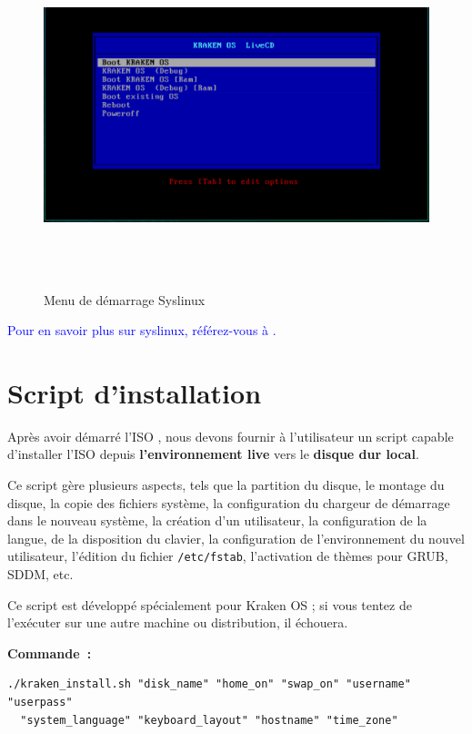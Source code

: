 \begin{figure}[H]
  \centering
  \includegraphics[width=1\textwidth, height=10cm]{images_pfe/syslinuxmenu.png}
  \caption{Menu de démarrage Syslinux}
  \label{fig:syslinux}
\end{figure}
\textcolor{blue}{Pour en savoir plus sur syslinux, référez-vous à \cite{syslinux}.}\\
\section{Script d'installation }
\label{secc:sctipttui}

Après avoir démarré l'ISO , nous devons fournir à l'utilisateur un script capable d'installer l'ISO depuis \textbf{l'environnement live} vers le \textbf{disque dur local}.

Ce script gère plusieurs aspects, tels que la partition du disque, le montage du disque, la copie des fichiers système, la configuration du chargeur de démarrage dans le nouveau système, la création d'un utilisateur, la configuration de la langue, de la disposition du clavier, la configuration de l'environnement du nouvel utilisateur, l'édition du fichier \texttt{/etc/fstab}, l'activation de thèmes pour GRUB, SDDM, etc.

Ce script est développé spécialement pour Kraken OS ; si vous tentez de l'exécuter sur une autre machine ou distribution, il échouera.




\textbf{Commande :}

\begin{lstlisting}
./kraken_install.sh "disk_name" "home_on" "swap_on" "username" "userpass" 
  "system_language" "keyboard_layout" "hostname" "time_zone"
\end{lstlisting}

